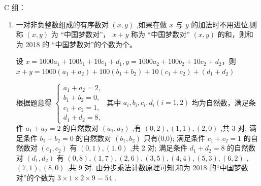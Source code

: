 C 组：
\begin{enumerate}
    \item 一对非负整数组成的有序数对 $\left( {x,y}\right)$ ,如果在做 $x$ 与 $y$ 的加法时不用进位,则称 $\left( {x,y}\right)$ 为 “中国梦数对”， $x + y$ 称为 “中国梦数对” $(x,y)$ 的和，则和为 2018 的 “中国梦数对”的个数为个。
    \begin{jieda}
        设 $x = {1000}{a}_{1} + {100}{b}_{1} + {10}{c}_{1} + {d}_{1},y = {1000}{a}_{2} + {100}{b}_{2} + {10}{c}_{2} + {d}_{2}$，则 $x + y = {1000}\left( {{a}_{1} + {a}_{2}}\right)  + {100}\left( {{b}_{1} + {b}_{2}}\right)  + {10}\left( {{c}_{1} + {c}_{2}}\right)  + \left( {{d}_{1} + {d}_{2}}\right)$ 
        
        根据题意得 $\left\{  \begin{array}{l} {a}_{1} + {a}_{2} = 2, \\  {b}_{1} + {b}_{2} = 0, \\  {c}_{1} + {c}_{2} = 1, \\  {d}_{1} + {d}_{2} = 8, \end{array}\right.$ 其中 ${a}_{i},{b}_{i},{c}_{i},{d}_{i}\left( {i = 1,2}\right)$ 均为自然数，满足条件 ${a}_{1} + {a}_{2} = 2$ 的自然数对 $\left( {{a}_{1},{a}_{2}}\right)$ ,有 $\left( {0,2}\right) ,\left( {1,1}\right) ,\left( {2,0}\right)$ ,共 3 对;
        满足条件 ${b}_{1} + {b}_{2} = 0$ 的自然数对 $\left( {{b}_{1},{b}_{2}}\right)$ 只有(0,0);
        满足条件 ${c}_{1} + {c}_{2} = 1$ 的自然数对 $\left( {{c}_{1},{c}_{2}}\right)$ 有 $\left( {0,1}\right) ,\left( {1,0}\right)$ ,共 2 对;
        满足条件 ${d}_{1} + {d}_{2} = 8$ 的自然数对 $\left( {{d}_{1},{d}_{2}}\right)$ 有 $\left( {0,8}\right) ,\left( {1,7}\right) ,\left( {2,6}\right) ,\left( {3,5}\right) ,\left( {4,4}\right) ,\left( {5,3}\right) ,\left( {6,2}\right)$ ,
        $\left( {7,1}\right) ,\left( {8,0}\right)$ ,共 9 对.
        由分步乘法计数原理可知,和为 2018 的“中国梦数对”的个数为 $3 \times  1 \times  2 \times  9 = {54}$ .
    \end{jieda}


\end{enumerate}
